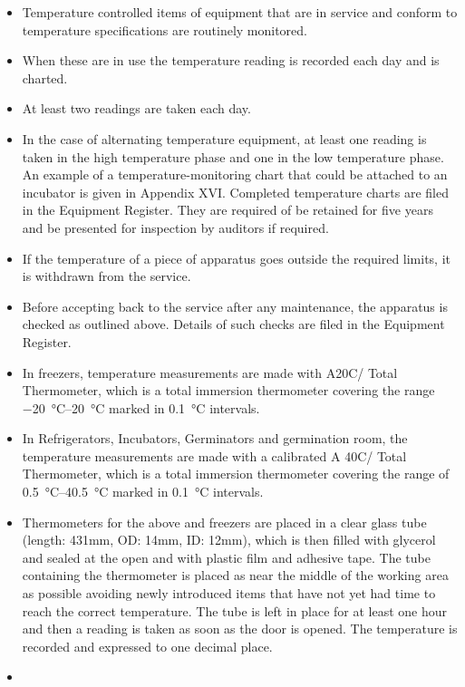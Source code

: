 \documentclass[]{book}
\providecommand{\tightlist}{%
  \setlength{\itemsep}{0pt}\setlength{\parskip}{0pt}}
\begin{document}
\begin{itemize}
\tightlist
\item
  Temperature controlled items of equipment that are in service and
  conform to temperature specifications are routinely monitored.
\item
  When these are in use the temperature reading is recorded each day and
  is charted.
\item
  At least two readings are taken each day.
\item
  In the case of alternating temperature equipment, at least one reading
  is taken in the high temperature phase and one in the low temperature
  phase. An example of a temperature-monitoring chart that could be
  attached to an incubator is given in Appendix XVI. Completed
  temperature charts are filed in the Equipment Register. They are
  required of be retained for five years and be presented for inspection
  by auditors if required.
\item
  If the temperature of a piece of apparatus goes outside the required
  limits, it is withdrawn from the service.
\item
  Before accepting back to the service after any maintenance, the
  apparatus is checked as outlined above. Details of such checks are
  filed in the Equipment Register.
\item
  In freezers, temperature measurements are made with A20C/ Total
  Thermometer, which is a total immersion thermometer covering the range
  \SIrange{-20}{20}{\celsius} marked in \SI{0.1}{\celsius} intervals.
\item
  In Refrigerators, Incubators, Germinators and germination room, the
  temperature measurements are made with a calibrated A 40C/ Total
  Thermometer, which is a total immersion thermometer covering the range
  of \SIrange{0.5}{40.5}{\celsius} marked in \SI{0.1}{\celsius}
  intervals.
\item
  Thermometers for the above and freezers are placed in a clear glass
  tube (length: 431mm, OD: 14mm, ID: 12mm), which is then filled with
  glycerol and sealed at the open and with plastic film and adhesive
  tape. The tube containing the thermometer is placed as near the middle
  of the working area as possible avoiding newly introduced items that
  have not yet had time to reach the correct temperature. The tube is
  left in place for at least one hour and then a reading is taken as
  soon as the door is opened. The temperature is recorded and expressed
  to one decimal place.
\item

\end{itemize}
\end{document}
